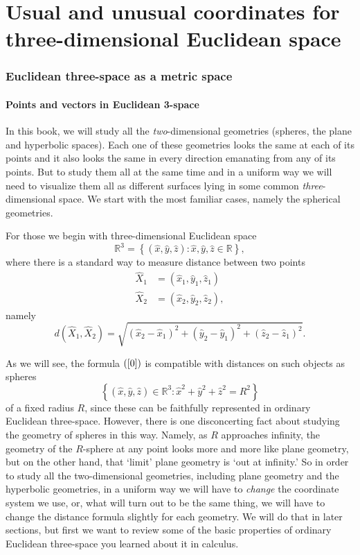 \documentclass{article}%
\begin{document}
\part{Usual and unusual coordinates for three-dimensional Euclidean
space\label{I}}

\section{Euclidean three-space as a metric space}

\subsection{Points and vectors in Euclidean 3-space}

In this book, we will study all the \textit{two}-dimensional geometries
(spheres, the plane and hyperbolic spaces). Each one of these geometries looks
the same at each of its points and it also looks the same in every direction
emanating from any of its points. But to study them all at the same time and
in a uniform way we will need to visualize them all as different surfaces
lying in some common \textit{three}-dimensional space. We start with the most
familiar cases, namely the spherical geometries.

For those we begin with three-dimensional Euclidean space%
\[
\mathbb{R}^{3}=\left\{  \left(  \hat{x},\hat{y},\hat{z}\right)  :\hat{x}%
,\hat{y},\hat{z}\in\mathbb{R}\right\}  ,
\]
where there is a standard way to measure distance between two points%
\begin{align*}
\hat{X}_{1}  &  =\left(  \hat{x}_{1},\hat{y}_{1},\hat{z}_{1}\right) \\
\hat{X}_{2}  &  =\left(  \hat{x}_{2},\hat{y}_{2},\hat{z}_{2}\right)  ,
\end{align*}
namely%
\begin{equation}
d\left(  \hat{X}_{1},\hat{X}_{2}\right)  =\sqrt{\left(  \hat{x}_{2}-\hat
{x}_{1}\right)  ^{2}+\left(  \hat{y}_{2}-\hat{y}_{1}\right)  ^{2}+\left(
\hat{z}_{2}-\hat{z}_{1}\right)  ^{2}}. \label{0}%
\end{equation}


As we will see, the formula $\left(  \ref{0}\right)  $ is compatible with
distances on such objects as spheres%
\[
\left\{  \left(  \hat{x},\hat{y},\hat{z}\right)  \in\mathbb{R}^{3}:\hat{x}%
^{2}+\hat{y}^{2}+\hat{z}^{2}=R^{2}\right\}
\]
of a fixed radius $R$, since these can be faithfully represented in ordinary
Euclidean three-space. However, there is one disconcerting fact about studying
the geometry of spheres in this way. Namely, as $R$ approaches infinity, the
geometry of the $R$-sphere at any point looks more and more like plane
geometry, but on the other hand, that `limit' plane geometry is `out at
infinity.' So in order to study all the two-dimensional geometries, including
plane geometry and the hyperbolic geometries, in a uniform way we will have to
\textit{change} the coordinate system we use, or, what will turn out to be the
same thing, we will have to change the distance formula slightly for each
geometry. We will do that in later sections, but first we want to review some
of the basic properties of ordinary Euclidean three-space you learned about it
in calculus.
\end{document}

